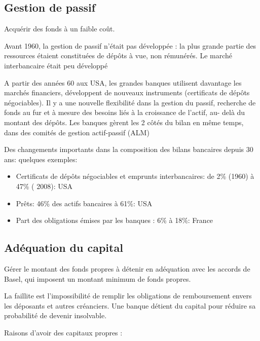 	\subsection{Gestion de passif}
	
	Acquérir des fonds à un faible coût.
	
	Avant 1960, la gestion de passif n'était pas développée : la plus grande partie des ressources étaient constituées de dépôts à vue, non rémunérés. Le marché interbancaire était peu développé 

	A partir des années 60 aux USA, les grandes banques utilisent davantage les marchés financiers, développent de nouveaux instruments (certificats de dépôts négociables). Il y a une nouvelle flexibilité dans la gestion du passif, recherche de fonds au fur et à mesure des besoins liés à la croissance de l'actif, au- delà du montant des dépôts. Les banques gèrent les 2 côtés du bilan en même 
temps, dans des comités de gestion actif-passif 
(ALM) 

Des changements importants dans la composition 
des bilans bancaires depuis 30 ans: quelques 
exemples: 
\begin{itemize}
	\item Certificats de dépôts négociables et emprunts 
interbancaires: de 2\% (1960) à 47\% ( 2008): USA 
	\item Prêts: 46\% des actifs bancaires à 61\%: USA 
	\item Part des obligations émises par les banques : 6\% à 
18\%: France 
\end{itemize}

	\subsection{Adéquation du capital}
	
	Gérer le montant des fonds propres à détenir en adéquation avec les accords de Basel, qui imposent un montant minimum de fonds propres.
	
	 La faillite est l'impossibilité de remplir les obligations de remboursement envers les déposants et autres créanciers. Une banque détient du capital pour réduire sa probabilité de devenir 
insolvable.
	
	Raisons d'avoir des capitaux propres :
	
